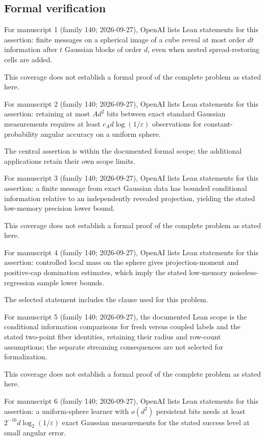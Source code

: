 \documentclass[11pt]{article}
\begin{document}
\subsection{Formal verification}
For manuscript 1 (family 140; 2026-09-27), OpenAI lists Lean statements for this assertion: finite messages on a spherical image of a cube reveal at most order $dt$ information after $t$ Gaussian blocks of order $d$, even when nested spread-restoring cells are added.

This coverage does not establish a formal proof of the complete problem as stated here.

For manuscript 2 (family 140; 2026-09-27), OpenAI lists Lean statements for this assertion: retaining at most $Ad^2$ bits between exact standard Gaussian measurements requires at least $c_A d\log(1/\varepsilon)$ observations for constant-probability angular accuracy on a uniform sphere.

The central assertion is within the documented formal scope; the additional applications retain their own scope limits.

For manuscript 3 (family 140; 2026-09-27), OpenAI lists Lean statements for this assertion: a finite message from exact Gaussian data has bounded conditional information relative to an independently revealed projection, yielding the stated low-memory precision lower bound.

This coverage does not establish a formal proof of the complete problem as stated here.

For manuscript 4 (family 140; 2026-09-27), OpenAI lists Lean statements for this assertion: controlled local mass on the sphere gives projection-moment and positive-cap domination estimates, which imply the stated low-memory noiseless-regression sample lower bounds.

The selected statement includes the clause used for this problem.

For manuscript 5 (family 140; 2026-09-27), the documented Lean scope is the conditional information comparisons for fresh versus coupled labels and the stated two-point fiber identities, retaining their radius and row-count assumptions; the separate streaming consequences are not selected for formalization.

This coverage does not establish a formal proof of the complete problem as stated here.

For manuscript 6 (family 140; 2026-09-27), OpenAI lists Lean statements for this assertion: a uniform-sphere learner with $o(d^2)$ persistent bits needs at least $2^{-16}d\log_2(1/\varepsilon)$ exact Gaussian measurements for the stated success level at small angular error.
\end{document}
